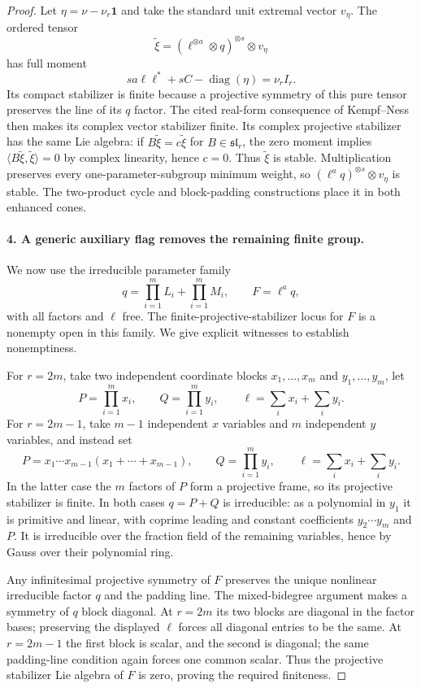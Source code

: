 \begin{proof}
Let $\eta=\nu-\nu_r\mathbf1$ and take the standard unit
extremal vector $v_\eta$. The ordered tensor
\[
 \widetilde\xi=(\ell^{\otimes a}\otimes q)^{\otimes s}
                                             \otimes v_\eta
\]
has full moment
\[
 sa\ell\ell^*+sC-\operatorname{diag}(\eta)
                                               =\nu_r I_r.
\]
Its compact stabilizer is finite because a projective symmetry
of this pure tensor preserves the line of its $q$ factor.
The cited real-form consequence of Kempf--Ness then makes
its complex vector stabilizer finite. Its complex projective
stabilizer has the same Lie algebra: if $B\widetilde\xi
=c\widetilde\xi$ for $B\in\mathfrak{sl}_r$, the zero moment
implies $\langle B\widetilde\xi,\widetilde\xi\rangle=0$
by complex linearity, hence $c=0$. Thus $\widetilde\xi$ is
stable. Multiplication preserves every one-parameter-subgroup
minimum weight, so $(\ell^a q)^{\otimes s}\otimes v_\eta$
is stable. The two-product cycle and block-padding constructions
place it in both enhanced cones.

\paragraph{4. A generic auxiliary flag removes the remaining finite group.}
We now use the irreducible parameter family
\[
 q=\prod_{i=1}^mL_i+\prod_{i=1}^mM_i,\qquad F=\ell^a q,
\]
with all factors and $\ell$ free. The finite-projective-stabilizer
locus for $F$ is a nonempty open in this family. We give explicit
witnesses to establish nonemptiness.

For $r=2m$, take two independent coordinate blocks $x_1,\ldots,x_m$
and $y_1,\ldots,y_m$, let
\[
 P=\prod_{i=1}^m x_i,\qquad Q=\prod_{i=1}^m y_i,
                    \qquad \ell=\sum_i x_i+\sum_i y_i.
\]
For $r=2m-1$, take $m-1$ independent $x$ variables and $m$
independent $y$ variables, and instead set
\[
 P=x_1\cdots x_{m-1}(x_1+\cdots+x_{m-1}),\qquad
 Q=\prod_{i=1}^m y_i,\qquad
 \ell=\sum_i x_i+\sum_i y_i.
\]
In the latter case the $m$ factors of $P$ form a projective frame,
so its projective stabilizer is finite. In both cases $q=P+Q$
is irreducible: as a polynomial in $y_1$ it is primitive and
linear, with coprime leading and constant coefficients
$y_2\cdots y_m$ and $P$. It is irreducible over the fraction
field of the remaining variables, hence by Gauss over their
polynomial ring.

Any infinitesimal projective symmetry of $F$ preserves the
unique nonlinear irreducible factor $q$ and the padding line.
The mixed-bidegree argument makes a symmetry of $q$ block
 diagonal. At $r=2m$ its two blocks are diagonal in the factor
bases; preserving the displayed $\ell$ forces all diagonal
entries to be the same. At $r=2m-1$ the first block is scalar,
and the second is diagonal; the same padding-line condition
again forces one common scalar. Thus the projective stabilizer
Lie algebra of $F$ is zero, proving the required finiteness.


\end{proof}

